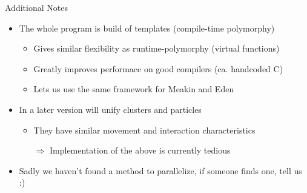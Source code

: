\documentclass[smaller]{beamer}
\begin{document}
\begin{frame}{Additional Notes}
  \begin{itemize}
    \item The whole program is build of templates (compile-time polymorphy)
      \begin{itemize}
        \item Gives similar flexibility as runtime-polymorphy (virtual
          functions) \pause
        \item Greatly improves performace on good compilers (ca. handcoded C)
          \pause
        \item Lets us use the same framework for Meakin and Eden
      \end{itemize} \pause
    \item In a later version will unify clusters and particles \pause
      \begin{itemize}
        \item They have similar movement and interaction characteristics
        \item[$\Rightarrow$] Implementation of the above is currently tedious
      \end{itemize} \pause
    \item Sadly we haven't found a method to parallelize, if someone finds one,
      tell us :)
  \end{itemize}
\end{frame}


            
\end{document}
